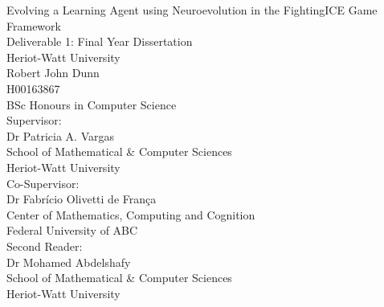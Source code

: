 \documentclass[11pt,a4paper]{article}
\begin{document}
{
\centering
\vspace{10mm}
{\huge Evolving a Learning Agent using Neuroevolution in the FightingICE Game Framework}\\
\vspace{20mm}
{\large Deliverable 1: Final Year Dissertation}\\
{\large Heriot-Watt University}\\
\vspace{10mm}
{\large Robert John Dunn\\
H00163867\\
BSc Honours in Computer Science\\
}
\vspace{10mm}
{\large Supervisor:}\\
Dr Patricia A. Vargas\\
School of Mathematical \& Computer Sciences\\
Heriot-Watt University
\vspace{3mm}\\
{\large Co-Supervisor:}\\
Dr Fabrício Olivetti de França\\
Center of Mathematics, Computing and Cognition\\
Federal University of ABC
\vspace{3mm}\\
Second Reader:\\
Dr Mohamed Abdelshafy\\
School of Mathematical \& Computer Sciences\\
Heriot-Watt University\\}
\newpage
\thispagestyle{empty}
\vspace*{30mm}
\end{document}
